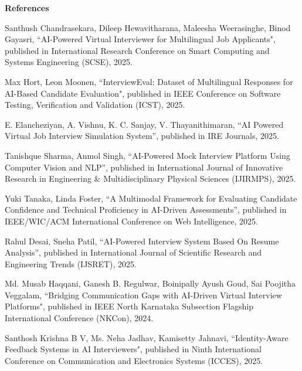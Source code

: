 \documentclass[12pt]{article}
\begin{document}
\setcounter{page}{49}

{\LARGE \textbf{References}}

\vspace{15pt}

\begin{enumerate}[label={[{\arabic*}]}, leftmargin=1cm]

\item Santhush Chandrasekara, Dileep Hewavitharana, Maleesha Weerasinghe, Binod Gayasri, ``AI-Powered Virtual Interviewer for Multilingual Job Applicants", published in International Research Conference on Smart Computing and Systems Engineering (SCSE), 2025.

\item Max Hort, Leon Moonen, ``InterviewEval: Dataset of Multilingual Responses for AI-Based Candidate Evaluation", published in IEEE Conference on Software Testing, Verification and Validation (ICST), 2025.

\item E. Elancheziyan, A. Vishnu, K. C. Sanjay, V. Thayanithimaran, “AI Powered Virtual Job Interview Simulation System”, published in IRE Journals, 2025.

\item Tanishque Sharma, Anmol Singh, “AI-Powered Mock Interview Platform Using Computer Vision and NLP”, published in International Journal of Innovative Research in Engineering & Multidisciplinary Physical Sciences (IJIRMPS), 2025.

\item Yuki Tanaka, Linda Foster, “A Multimodal Framework for Evaluating Candidate Confidence and Technical Proficiency in AI-Driven Assessments”, published in IEEE/WIC/ACM International Conference on Web Intelligence, 2025.

\item Rahul Desai, Sneha Patil, “AI-Powered Interview System Based On Resume Analysis”, published in International Journal of Scientific Research and Engineering Trends (IJSRET), 2025.

\item Md. Musab Haqqani, Ganesh B. Regulwar, Boinipally Ayush Goud, Sai Poojitha Veggalam, ``Bridging Communication Gaps with AI-Driven Virtual Interview Platforms", published in IEEE North Karnataka Subsection Flagship International Conference (NKCon), 2024.

\item Santhosh Krishna B V, Ms. Neha Jadhav, Kamisetty Jahnavi, ``Identity-Aware Feedback Systems in AI Interviewers", published in Ninth International Conference on Communication and Electronics Systems (ICCES), 2025.


\end{enumerate}
\end{document}
